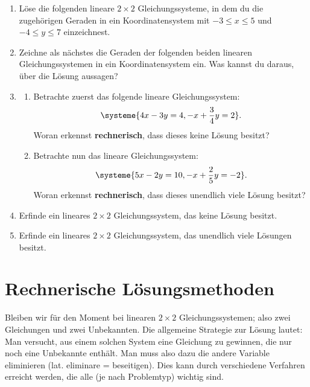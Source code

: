 \documentclass[11pt,oneside]{article}
\begin{document}
	\begin{aufgabe}
		\begin{enumerate}
			\item Löse die folgenden lineare $2\times2$ Gleichungssysteme, in dem du die zugehörigen Geraden in ein Koordinatensystem mit $-3\leq x\leq 5$ und $-4\leq y\leq 7$ einzeichnest.
			\item Zeichne als nächstes die Geraden der folgenden beiden linearen Gleichungssystemen in ein Koordinatensystem ein. Was kannst du daraus, über die Lösung aussagen?
			\item \begin{enumerate}[label=\alph*)]
				\item Betrachte zuerst das folgende lineare Gleichungssystem: \[\systeme{4x-3y=4,-x+\frac{3}{4}y=2}.\] Woran erkennst \textbf{rechnerisch}, dass dieses keine Lösung besitzt?
				\item Betrachte nun das lineare Gleichungssystem: \[\systeme{5x-2y=10,-x+\frac{2}{5}y=-2}.\] Woran erkennst \textbf{rechnerisch}, dass dieses unendlich viele Lösung besitzt?
			\end{enumerate}
			\item Erfinde ein lineares $2\times2$ Gleichungssystem, das keine Lösung besitzt.
			\item Erfinde ein lineares $2\times2$ Gleichungssystem, das unendlich viele Lösungen besitzt.
		\end{enumerate}
	\end{aufgabe}
	\newpage

\section{Rechnerische Lösungsmethoden}
	Bleiben wir für den Moment bei linearen $2\times2$ Gleichungssystemen; also zwei Gleichungen und zwei Unbekannten.\vspace*{11pt}\newline
	Die allgemeine Strategie zur Lösung lautet:\newline
	Man versucht, aus einem solchen System eine Gleichung zu gewinnen, die nur noch eine Unbekannte enthält. Man muss also dazu die andere Variable eliminieren (lat. eliminare = beseitigen).\vspace*{11pt}\newline
	Dies kann durch verschiedene Verfahren erreicht werden, die alle (je nach Problemtyp) wichtig sind.
\end{document}

